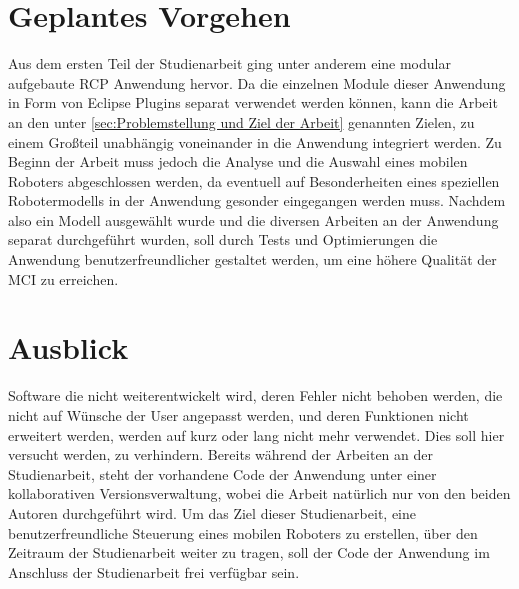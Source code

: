 \section{Geplantes Vorgehen}
Aus dem ersten Teil der Studienarbeit ging unter anderem eine modular aufgebaute \gls{RCP} Anwendung hervor. Da die einzelnen Module dieser Anwendung in Form von Eclipse Plugins separat verwendet werden k\"onnen, kann die Arbeit an den unter \ref{sec:Problemstellung und Ziel der Arbeit} genannten Zielen, zu einem Gro\ss teil unabh\"angig voneinander in die Anwendung integriert werden.
\newline
Zu Beginn der Arbeit muss jedoch die Analyse und die Auswahl eines mobilen Roboters abgeschlossen werden, da eventuell auf Besonderheiten eines speziellen Robotermodells in der Anwendung gesonder eingegangen werden muss.
\newline
Nachdem also ein Modell ausgew\"ahlt wurde und die diversen Arbeiten an der Anwendung separat durchgef\"uhrt wurden, soll durch Tests und Optimierungen die Anwendung benutzerfreundlicher gestaltet werden, um eine h\"ohere Qualit\"at der \gls{MCI} zu erreichen.

\section{Ausblick}
Software die nicht weiterentwickelt wird, deren Fehler nicht behoben werden, die nicht auf W\"unsche der User angepasst werden, und deren Funktionen nicht erweitert werden, werden auf kurz oder lang nicht mehr verwendet. Dies soll hier versucht werden, zu verhindern. Bereits w\"ahrend der Arbeiten an der Studienarbeit, steht der vorhandene Code der Anwendung unter einer kollaborativen Versionsverwaltung, wobei die Arbeit nat\"urlich nur von den beiden Autoren durchgef\"uhrt wird. Um das Ziel dieser Studienarbeit, eine benutzerfreundliche Steuerung eines mobilen Roboters zu erstellen, \"uber den Zeitraum der Studienarbeit weiter zu tragen, soll der Code der Anwendung im Anschluss der Studienarbeit frei verf\"ugbar sein.